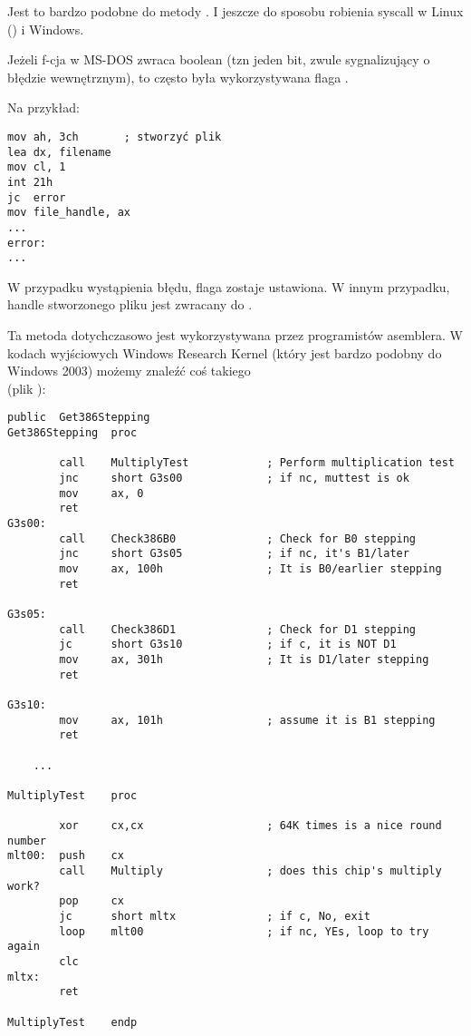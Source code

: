 Jest to bardzo podobne do metody .
I jeszcze do sposobu robienia syscall w Linux () i Windows.

Jeżeli f-cja w MS-DOS zwraca boolean (tzn jeden bit, zwule sygnalizujący o błędzie wewnętrznym),
to często była wykorzystywana flaga .

Na przykład:

\begin{lstlisting}[style=customasmx86]
mov ah, 3ch       ; stworzyć plik
lea dx, filename
mov cl, 1
int 21h
jc  error
mov file_handle, ax
...
error:
...
\end{lstlisting}

W przypadku wystąpienia błędu, flaga  zostaje ustawiona.
W innym przypadku, handle stworzonego pliku jest zwracany do .

Ta metoda dotychczasowo jest wykorzystywana przez programistów asemblera.
W kodach wyjściowych Windows Research Kernel (który jest bardzo podobny do Windows 2003) możemy znaleźć coś takiego\\
(plik ):

\begin{lstlisting}[style=customasmx86]
        public  Get386Stepping
Get386Stepping  proc

        call    MultiplyTest            ; Perform multiplication test
        jnc     short G3s00             ; if nc, muttest is ok
        mov     ax, 0
        ret
G3s00:
        call    Check386B0              ; Check for B0 stepping
        jnc     short G3s05             ; if nc, it's B1/later
        mov     ax, 100h                ; It is B0/earlier stepping
        ret

G3s05:
        call    Check386D1              ; Check for D1 stepping
        jc      short G3s10             ; if c, it is NOT D1
        mov     ax, 301h                ; It is D1/later stepping
        ret

G3s10:
        mov     ax, 101h                ; assume it is B1 stepping
        ret

	...

MultiplyTest    proc

        xor     cx,cx                   ; 64K times is a nice round number
mlt00:  push    cx
        call    Multiply                ; does this chip's multiply work?
        pop     cx
        jc      short mltx              ; if c, No, exit
        loop    mlt00                   ; if nc, YEs, loop to try again
        clc
mltx:
        ret

MultiplyTest    endp
\end{lstlisting}



